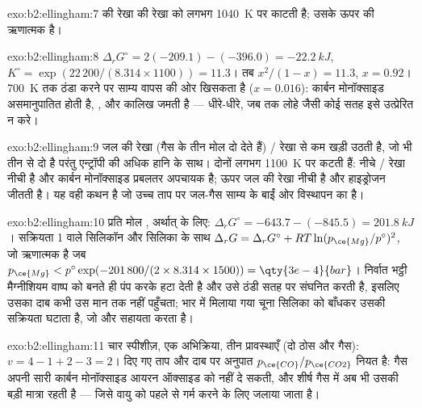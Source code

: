 \begin{solution}{exo:b2:ellingham:7}
 की रेखा  की रेखा को लगभग
\qty{1040}{K} पर काटती है; उसके ऊपर  की  ऋणात्मक है।
\end{solution}

\begin{solution}{exo:b2:ellingham:8}
$\Delta_r G^\circ = 2(-209.1) - (-396.0) = \qty{-22.2}{kJ}$, $K^\circ =
\exp(22\,200/(8.314 \times 1100)) = 11.3$। तब $x^2/(1 - x) = 11.3$, $x =
0.92$। \qty{700}{K} तक ठंडा करने पर साम्य वापस  की ओर खिसकता है
($x = 0.016$): कार्बन मोनॉक्साइड असमानुपातित होती है, , और
कालिख जमती है --- धीरे-धीरे, जब तक लोहे जैसी कोई सतह इसे उत्प्रेरित न करे।
\end{solution}

\begin{solution}{exo:b2:ellingham:9}
जल की रेखा (गैस के तीन मोल दो देते हैं) / रेखा से कम
खड़ी उठती है, जो भी तीन से दो है परंतु एन्ट्रॉपी की अधिक हानि के साथ।
दोनों लगभग \qty{1100}{K} पर कटती हैं: नीचे / रेखा नीची है और
कार्बन मोनॉक्साइड प्रबलतर अपचायक है; ऊपर जल की रेखा नीची है और
हाइड्रोजन जीतती है। यह वही कथन है जो उच्च ताप पर जल-गैस साम्य
 के बाईं ओर विस्थापन का है।
\end{solution}

\begin{solution}{exo:b2:ellingham:10}
प्रति मोल , अर्थात्  के लिए: $\Delta_r
G^\circ = -643.7 - (-845.5) = \qty{+201.8}{kJ}$। सक्रियता 1 वाले सिलिकॉन और सिलिका
के साथ $\Delta_r G = \Delta_r G^\circ + RT\ln(p_{\ce{Mg}}/p^\circ)^2$, जो ऋणात्मक है
जब $p_{\ce{Mg}} < p^\circ\exp(-201\,800/(2 \times 8.314 \times 1500)) =
\qty{3e-4}{bar}$। निर्वात भट्ठी मैग्नीशियम वाष्प को बनते ही पंप करके हटा देती है
और उसे ठंडी सतह पर संघनित करती है, इसलिए उसका दाब कभी उस मान तक नहीं पहुँचता;
भार में मिलाया गया चूना सिलिका को बाँधकर उसकी सक्रियता घटाता है,
जो और सहायता करता है।
\end{solution}

\begin{solution}{exo:b2:ellingham:11}
चार स्पीशीज़, एक अभिक्रिया, तीन प्रावस्थाएँ (दो ठोस और गैस): $v = 4 - 1 +
2 - 3 = 2$। दिए गए ताप और दाब पर अनुपात $p_{\ce{CO}}/p_{\ce{CO2}}$
नियत है: गैस अपनी सारी कार्बन मोनॉक्साइड आयरन ऑक्साइड को नहीं दे सकती,
और शीर्ष गैस में अब भी उसकी बड़ी मात्रा रहती है --- जिसे वायु को पहले से गर्म
करने के लिए जलाया जाता है।
\end{solution}

